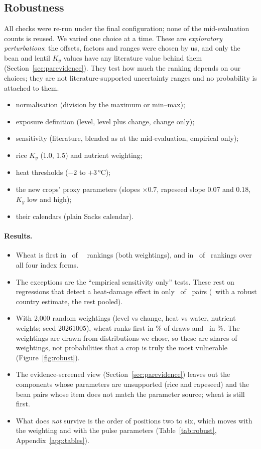 \subsection{Robustness}\label{sec:robust}
All checks were re-run under the final configuration; none of the mid-evaluation counts is reused. We varied one
choice at a time. These are \emph{exploratory perturbations}: the offsets, factors and ranges were chosen by us, and
only the bean and lentil $K_y$ values have any literature value behind them (Section~\ref{sec:parevidence}). They
test how much the ranking depends on our choices; they are not literature-supported uncertainty ranges and no
probability is attached to them.
\begin{itemize}
\item normalisation (division by the maximum or min--max);
\item exposure definition (level, level plus change, change only);
\item sensitivity (literature, blended as at the mid-evaluation, empirical only);
\item rice $K_y$ (1.0, 1.5) and nutrient weighting;
\item heat thresholds ($-2$ to $+3$\,\si{\celsius});
\item the new crops' proxy parameters (slopes $\times0.7$, rapeseed slope 0.07 and 0.18, $K_y$ low and high);
\item their calendars (plain Sacks calendar).
\end{itemize}

\paragraph{Results.}
\begin{itemize}
\item Wheat is first in \robTopFfour\ of \robNFfour\ \Fd\ rankings (both weightings), and in \robTopAll\ of \robN\
rankings over all four index forms.
\item The exceptions are the ``empirical sensitivity only'' tests. These rest on regressions that detect a
heat-damage effect in only \empHeatDetected\ of \empN\ pairs (\empHeatCountry\ with a robust country estimate, the
rest pooled).
\item With 2,000 random weightings (level vs change, heat vs water, nutrient weights; seed 20261005), wheat ranks
first in \mcTopShare\% of draws and \mcSecond\ in \mcSecondShare\%. The weightings are drawn from distributions we
chose, so these are shares of weightings, not probabilities that a crop is truly the most vulnerable
(Figure~\ref{fig:robust}).
\item The evidence-screened view (Section~\ref{sec:parevidence}) leaves out the components whose parameters are
unsupported (rice and rapeseed) and the bean pairs whose item does not match the parameter source; wheat is still
first.
\item What does \emph{not} survive is the order of positions two to six, which moves with the weighting and with
the pulse parameters (Table~\ref{tab:robust}, Appendix~\ref{app:tables}).
\end{itemize}

